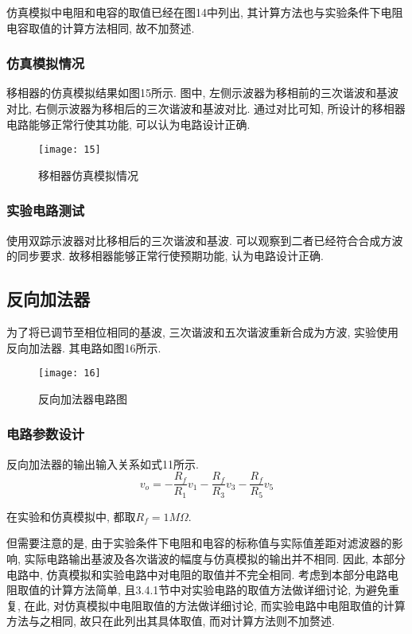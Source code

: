 \documentclass[UTF2]{ctexart}
\begin{document}
	仿真模拟中电阻和电容的取值已经在图14中列出, 其计算方法也与实验条件下电阻电容取值的计算方法相同, 故不加赘述.
	
	\subsubsection{仿真模拟情况}
	
	移相器的仿真模拟结果如图15所示. 图中, 左侧示波器为移相前的三次谐波和基波对比, 右侧示波器为移相后的三次谐波和基波对比. 通过对比可知, 所设计的移相器电路能够正常行使其功能, 可以认为电路设计正确.
	
	\begin{figure}[h]
		\centering
		\texttt{[image: 15]}
		\caption{移相器仿真模拟情况}
	\end{figure}
	
	\subsubsection{实验电路测试}
	
	使用双踪示波器对比移相后的三次谐波和基波. 可以观察到二者已经符合合成方波的同步要求. 故移相器能够正常行使预期功能, 认为电路设计正确.
	
	\subsection{反向加法器} %
	
	为了将已调节至相位相同的基波, 三次谐波和五次谐波重新合成为方波, 实验使用反向加法器. 其电路如图16所示.
	
	\begin{figure}[h]
		\centering
		\texttt{[image: 16]}
		\caption{反向加法器电路图}
	\end{figure}
	
	\subsubsection{电路参数设计}
	
	反向加法器的输出输入关系如式11所示. 
	\begin{equation}
		v_o = - \frac{R_f}{R_1} v_1 - \frac{R_f}{R_3} v_3 - \frac{R_f}{R_5} v_5
	\end{equation}
	
	在实验和仿真模拟中, 都取$R_f = 1M \Omega$. 
	
	但需要注意的是, 由于实验条件下电阻和电容的标称值与实际值差距对滤波器的影响, 实际电路输出基波及各次谐波的幅度与仿真模拟的输出并不相同. 因此, 本部分电路中, 仿真模拟和实验电路中对电阻的取值并不完全相同. 考虑到本部分电路电阻取值的计算方法简单, 且3.4.1节中对实验电路的取值方法做详细讨论, 为避免重复, 在此, 对仿真模拟中电阻取值的方法做详细讨论, 而实验电路中电阻取值的计算方法与之相同, 故只在此列出其具体取值, 而对计算方法则不加赘述.
	
\end{document}
